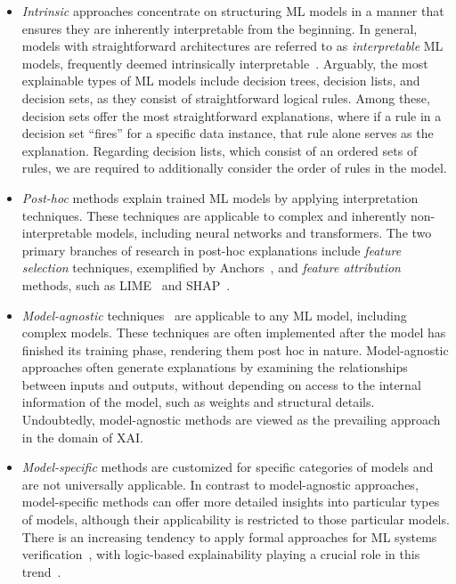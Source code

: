 \begin{itemize}
	\item \emph{Intrinsic} approaches concentrate on structuring ML models in a manner that 
		ensures they are inherently interpretable from the beginning.
		In general, models with straightforward architectures are referred to as
		\emph{interpretable} ML models, frequently deemed intrinsically interpretable~\cite{rudin-natmi19}.
		Arguably, the most explainable types of ML models include decision trees,
		decision lists, and decision sets, as they consist of straightforward logical rules.
		Among these, decision sets offer the most straightforward explanations,
		where if a rule in a decision set ``fires'' for a specific data instance, 
		that rule alone serves as the explanation.
		Regarding decision lists, which consist of an ordered sets of rules,
		we are required to additionally consider the order of rules in the model.

	\item \emph{Post-hoc} methods explain trained ML models by applying interpretation
		techniques.
		These techniques are applicable to complex and inherently non-interpretable models, 
		including neural networks and transformers.
		The two primary branches of research in post-hoc explanations include
		\emph{feature selection} techniques, exemplified by Anchors~\cite{guestrin-aaai18}, 
		and \emph{feature attribution} methods, such as LIME~\cite{guestrin-kdd16} and SHAP~\cite{lundberg-nips17}.

	\item \emph{Model-agnostic} techniques~\cite{guestrin-kdd16,lundberg-nips17,guestrin-aaai18} are 
		applicable to any ML model, including complex models.
		These techniques are often implemented after the model has finished its
		training phase, rendering them post hoc in nature.
		Model-agnostic approaches often generate explanations by examining 
		the relationships between inputs and outputs, without depending on access to 
		the internal information of the model, such as weights and structural details.
		Undoubtedly, model-agnostic methods are viewed as the prevailing approach 
		in the domain of XAI.
	
	\item \emph{Model-specific} methods are customized for specific categories of models
		and are not universally applicable.
		In contrast to model-agnostic approaches, model-specific methods can offer more
		detailed insights into particular types of models, although their applicability is 
		restricted to those particular models.
		There is an increasing tendency to apply formal approaches for ML systems
		verification~\cite{sss-cacm22}, with logic-based explainability playing a crucial role in 
		this trend~\cite{ignatiev-ijcai20,msi-aaai22,darwiche-lics23,ms-rw22,msi-fai23}.
\end{itemize}

